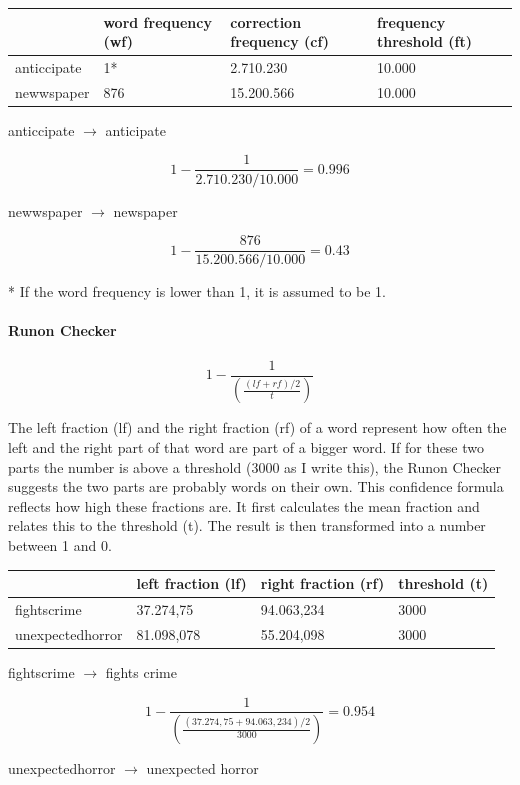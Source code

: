 \documentclass[12pt]{article}
\begin{document}
\begin{table}[h]
\begin{tabular}{|l|lll|}
\hline
&word frequency (wf)&correction frequency (cf)&frequency threshold (ft)\\ 
\hline
anticcipate&1*&2.710.230&10.000\\
newwspaper&876&15.200.566&10.000\\
\hline
\end{tabular}
\end{table}

anticcipate $\rightarrow$ anticipate

\[
1 - \frac{1}{2.710.230/10.000} = 0.996
\]

newwspaper $\rightarrow$ newspaper

\[
1 - \frac{876}{15.200.566/10.000} = 0.43
\]

* If the word frequency is lower than 1, it is assumed to be 1.

\paragraph{Runon Checker}

\[
1 - \frac{1}{(\frac{(lf+rf)/2}{t})}
\]

The left fraction (lf) and the right fraction (rf) of a word represent how often the left and the right part of that word are part of a bigger word. If for these two parts the number is above a threshold (3000 as I write this), the Runon Checker suggests the two parts are probably words on their own. This confidence formula reflects how high these fractions are. It first calculates the mean fraction and relates this to the threshold (t). The result is then transformed into a number between 1 and 0.

\begin{table}[h]
\begin{tabular}{|l|lll|}
\hline
&left fraction (lf)&right fraction (rf)&threshold (t)\\ 
\hline
fightscrime&37.274,75&94.063,234&3000\\
unexpectedhorror&81.098,078&55.204,098&3000\\
\hline
\end{tabular}
\end{table}

fightscrime $\rightarrow$ fights crime

\[
1 - \frac{1}{(\frac{(37.274,75+94.063,234)/2}{3000})} = 0.954
\]

unexpectedhorror $\rightarrow$ unexpected horror
\end{document}
